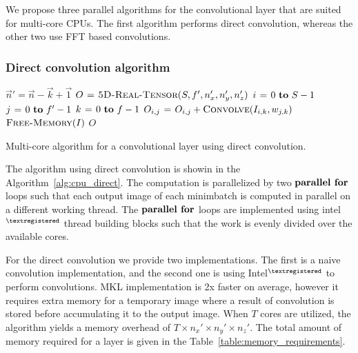 \documentclass[conference]{IEEEtran}
\begin{document}
  We propose three parallel algorithms for the convolutional layer
  that are suited for multi-core CPUs.  The first algorithm performs
  direct convolution, whereas the other two use FFT based
  convolutions.

\subsubsection{Direct convolution algorithm}

  \begin{algorithm}
    {\small
      \begin{codebox}
        \li $\vec{n}' = \vec{n} - \vec{k} + \vec{1}$
        \li $O \mathrel{\hspace{1pt}=\hspace{1pt}} \textnormal{\scshape5D-Real-Tensor}(S,f',n'_x,n'_y,n'_z)$
        \li {} $i \gets 0 \To S-1$
        \li   \Do {} $j \gets 0 \To f'-1$
        \li     \Do \For $k \gets 0 \To f-1$
        \li     \Do $O_{i,j} \mathrel{\hspace{1pt}=\hspace{1pt}} O_{i,j} + \textnormal{\scshape Convolve}(I_{i,k},w_{j,k})$
        \End \End \End
        \li $\textnormal{\scshape Free-Memory}(I)$
        \li \Return $O$
      \end{codebox}
    }

    \caption{Multi-core algorithm for a convolutional layer using direct
      convolution.}
    \label{alg:cpu_direct}
  \end{algorithm}

  The algorithm using direct convolution is showin in the
  Algorithm~\ref{alg:cpu_direct}.  The computation is parallelized by
  two $\textbf{parallel for}$ loops such that each output image of each
  minimbatch is computed in parallel on a different working thread.
  The $\textbf{parallel for}$ loops are implemented using intel$^{\small
    \textregistered}$ thread building blocks such that the work is
  evenly divided over the available cores.

  For the direct convolution we provide two implementations.  The
  first is a naive convolution implementation, and the second one is
  using Intel$^{\small \textregistered}$ to perform convolutions.  MKL
  implementation is 2x faster on average, however it requires extra
  memory for a temporary image where a result of convolution is stored
  before accumulating it to the output image.  When $T$ cores are
  utilized, the algorithm yields a memory overhead of $T \times n_x'
  \times n_y' \times n_z'$.  The total amount of memory required for a
  layer is given in the Table~\ref{table:memory_requirements}.
\end{document}
